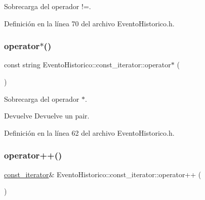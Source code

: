 Sobrecarga del operador !=. 



Definición en la línea 70 del archivo Evento\+Historico.\+h.

\hypertarget{classEventoHistorico_1_1const__iterator_a2b037cb7509ddf4ff0972ceded59c13b}{}\label{classEventoHistorico_1_1const__iterator_a2b037cb7509ddf4ff0972ceded59c13b} 
\subsubsection{\texorpdfstring{operator$\ast$()}{operator*()}}
{\footnotesize\ttfamily const string Evento\+Historico\+::const\+\_\+iterator\+::operator$\ast$ (\begin{DoxyParamCaption}{ }\end{DoxyParamCaption})\hspace{0.3cm}{\ttfamily [inline]}}



Sobrecarga del operador $\ast$. 

\begin{DoxyReturn}{Devuelve}
Devuelve un pair. 
\end{DoxyReturn}


Definición en la línea 62 del archivo Evento\+Historico.\+h.

\hypertarget{classEventoHistorico_1_1const__iterator_ac61db745de3874f53f9b0e4086f02195}{}\label{classEventoHistorico_1_1const__iterator_ac61db745de3874f53f9b0e4086f02195} 
\subsubsection{\texorpdfstring{operator++()}{operator++()}}
{\footnotesize\ttfamily \hyperlink{classEventoHistorico_1_1const__iterator}{const\+\_\+iterator}\& Evento\+Historico\+::const\+\_\+iterator\+::operator++ (\begin{DoxyParamCaption}{ }\end{DoxyParamCaption})\hspace{0.3cm}{\ttfamily [inline]}}



